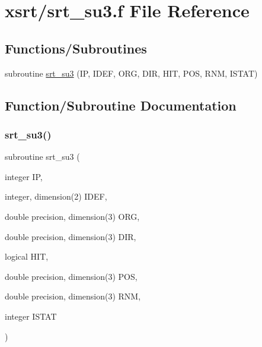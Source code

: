 \hypertarget{srt__su3_8f}{}\section{xsrt/srt\+\_\+su3.f File Reference}
\label{srt__su3_8f}
\subsection*{Functions/\+Subroutines}
\begin{DoxyCompactItemize}
\item 
subroutine \hyperlink{srt__su3_8f_a987d6c6673ba1bd343af9ed5b47c21b0}{srt\+\_\+su3} (IP, I\+D\+EF, O\+RG, D\+IR, H\+IT, P\+OS, R\+NM, I\+S\+T\+AT)
\end{DoxyCompactItemize}


\subsection{Function/\+Subroutine Documentation}
\mbox{\label{srt__su3_8f_a987d6c6673ba1bd343af9ed5b47c21b0}} 
\subsubsection{\texorpdfstring{srt\+\_\+su3()}{srt\_su3()}}
{\footnotesize\ttfamily subroutine srt\+\_\+su3 (\begin{DoxyParamCaption}\item[{integer}]{IP,  }\item[{integer, dimension(2)}]{I\+D\+EF,  }\item[{double precision, dimension(3)}]{O\+RG,  }\item[{double precision, dimension(3)}]{D\+IR,  }\item[{logical}]{H\+IT,  }\item[{double precision, dimension(3)}]{P\+OS,  }\item[{double precision, dimension(3)}]{R\+NM,  }\item[{integer}]{I\+S\+T\+AT }\end{DoxyParamCaption})}

